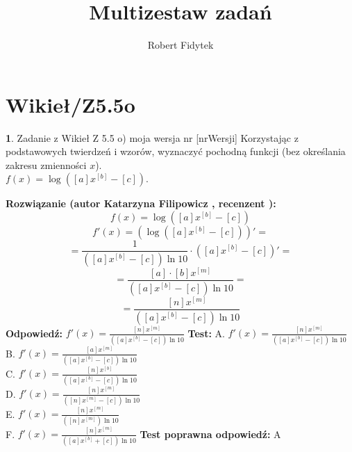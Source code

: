 \documentclass[12pt, a4paper]{article}
\title{Multizestaw zadań}
\author{Robert Fidytek}
\date{}
\theoremstyle{definition} %
\newtheorem{zad}{}
\newcommand{\kategoria}[1]{\section{#1}} %
\newcommand{\zadStart}[1]{\begin{zad}#1\newline} %
\newcommand{\zadStop}{\end{zad}}   %
\newcommand{\rozwStart}[2]{\noindent \textbf{Rozwiązanie (autor #1 , recenzent #2): }\newline} %
\newcommand{\rozwStop}{\newline}                                            %
\newcommand{\odpStart}{\noindent \textbf{Odpowiedź:}\newline}    %
\newcommand{\odpStop}{\newline}                                             %
\newcommand{\testStart}{\noindent \textbf{Test:}\newline} %
\newcommand{\testStop}{\newline} %
\newcommand{\kluczStart}{\noindent \textbf{Test poprawna odpowiedź:}\newline} %
\newcommand{\kluczStop}{\newline} %
\begin{document}
\maketitle


\kategoria{Wikieł/Z5.5o}
\zadStart{Zadanie z Wikieł Z 5.5 o) moja wersja nr [nrWersji]}
Korzystając z podstawowych twierdzeń i wzorów, wyznaczyć pochodną funkcji (bez określania zakresu zmienności $x$).\\ $f(x)=\log([a]x^{[b]}-[c])$.
\zadStop
\rozwStart{Katarzyna Filipowicz}{}
$$f(x)=\log([a]x^{[b]}-[c])$$
$$f'(x)=\left(\log([a]x^{[b]}-[c])\right)' = $$
$$ = \frac{1}{([a]x^{[b]}-[c])\ln10}\cdot ([a]x^{[b]}-[c] )'= $$
$$
= \frac{[a]\cdot [b]x^{[m]}}{([a]x^{[b]}-[c])\ln10}=
$$ $$
=\frac{[n]x^{[m]}}{([a]x^{[b]}-[c])\ln10}
$$
\rozwStop
\odpStart
$ f'(x)=\frac{[n]x^{[m]}}{([a]x^{[b]}-[c])\ln10}$
\odpStop
\testStart
A. $ f'(x)=\frac{[n]x^{[m]}}{([a]x^{[b]}-[c])\ln10}$\\
B. $ f'(x)=\frac{[a]x^{[m]}}{([a]x^{[b]}-[c])\ln10}$\\
C. $ f'(x)=\frac{[n]x^{[b]}}{([a]x^{[b]}-[c])\ln10}$ \\
D. $ f'(x)=\frac{[n]x^{[m]}}{([n]x^{[m]}-[c])\ln10}$\\
E. $ f'(x)=\frac{[n]x^{[m]}}{([n]x^{[m]})\ln10}$\\
F. $ f'(x)=\frac{[n]x^{[m]}}{([a]x^{[b]}+[c])\ln10}$
\testStop
\kluczStart
A
\kluczStop
\end{document}
